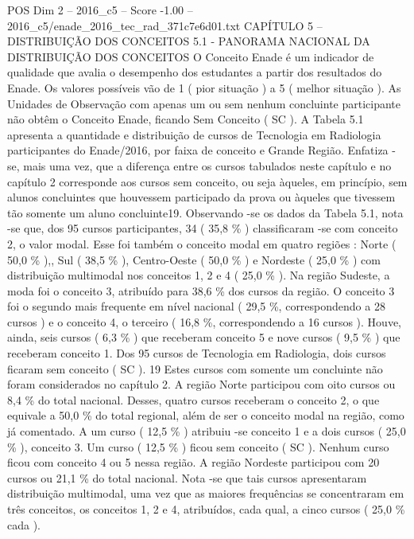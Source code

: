 \begin{textsample}{POS Dim 2 – 2016\_c5 – Score -1.00 – 2016\_c5/enade\_2016\_tec\_rad\_371c7e6d01.txt}  \label{ex:f2_pos_395}
CAPÍTULO 5 – DISTRIBUIÇÃO DOS CONCEITOS 5.1 - PANORAMA NACIONAL DA DISTRIBUIÇÃO DOS CONCEITOS O Conceito Enade é um indicador de qualidade que avalia o desempenho dos estudantes a partir dos resultados do Enade.
Os valores possíveis vão de 1 ( pior situação ) a 5 ( melhor situação ).
As Unidades de Observação com apenas um ou sem nenhum concluinte participante não obtêm o Conceito Enade, ficando Sem Conceito ( SC ).
A Tabela 5.1 apresenta a quantidade e distribuição de cursos de Tecnologia em Radiologia participantes do Enade/2016, por faixa de conceito e Grande Região.
Enfatiza -se, mais uma vez, que a diferença entre os cursos tabulados neste capítulo e no capítulo 2 corresponde aos cursos sem conceito, ou seja àqueles, em princípio, sem alunos concluintes que houvessem participado da prova ou àqueles que tivessem tão somente um aluno concluinte19.
Observando -se os dados da Tabela 5.1, nota -se que, dos 95 cursos participantes, 34 ( 35,8 \% ) classificaram -se com conceito 2, o valor modal.
Esse foi também o conceito modal em quatro regiões : Norte ( 50,0 \% ),, Sul ( 38,5 \% ), Centro-Oeste ( 50,0 \% ) e Nordeste ( 25,0 \% ) com distribuição multimodal nos conceitos 1, 2 e 4 ( 25,0 \% ).
Na região Sudeste, a moda foi o conceito 3, atribuído para 38,6 \% dos cursos da região.
O conceito 3 foi o segundo mais frequente em nível nacional ( 29,5 \%, correspondendo a 28 cursos ) e o conceito 4, o terceiro ( 16,8 \%, correspondendo a 16 cursos ).
Houve, ainda, seis cursos ( 6,3 \% ) que receberam conceito 5 e nove cursos ( 9,5 \% ) que receberam conceito 1.
Dos 95 cursos de Tecnologia em Radiologia, dois cursos ficaram sem conceito ( SC ). 19 Estes cursos com somente um concluinte não foram considerados no capítulo 2.
A região Norte participou com oito cursos ou 8,4 \% do total nacional.
Desses, quatro cursos receberam o conceito 2, o que equivale a 50,0 \% do total regional, além de ser o conceito modal na região, como já comentado.
A um curso ( 12,5 \% ) atribuiu -se conceito 1 e a dois cursos ( 25,0 \% ), conceito 3.
Um curso ( 12,5 \% ) ficou sem conceito ( SC ).
Nenhum curso ficou com conceito 4 ou 5 nessa região.
A região Nordeste participou com 20 cursos ou 21,1 \% do total nacional.
Nota -se que tais cursos apresentaram distribuição multimodal, uma vez que as maiores frequências se concentraram em três conceitos, os conceitos 1, 2 e 4, atribuídos, cada qual, a cinco cursos ( 25,0 \% cada ).

\end{textsample}
